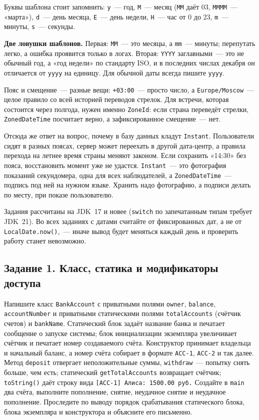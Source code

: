 Буквы шаблона стоит запомнить: \texttt{y}~--- год, \texttt{M}~--- месяц
(\texttt{MM} даёт 03, \texttt{MMMM}~--- «марта»), \texttt{d}~--- день месяца,
\texttt{E}~--- день недели, \texttt{H}~--- час от 0 до 23, \texttt{m}~---
минуты, \texttt{s}~--- секунды.

\begin{oshibka}
\textbf{Две ловушки шаблонов.} Первая: \texttt{MM}~--- это месяцы, а
\texttt{mm}~--- минуты; перепутать легко, а ошибка проявится только в логах.
Вторая: \texttt{YYYY} заглавными~--- это не обычный год, а «год недели» по
стандарту ISO, и в последних числах декабря он отличается от \texttt{yyyy} на
единицу. Для обычной даты всегда пишите \texttt{yyyy}.
\end{oshibka}

Пояс и смещение~--- разные вещи: \texttt{+03:00}~--- просто число, а
\texttt{Europe/Moscow}~--- целое правило со всей историей переводов стрелок.
Для встречи, которая состоится через полгода, нужен именно \texttt{ZoneId}:
если страна переведёт стрелки, \texttt{ZonedDateTime} посчитает верно, а
зафиксированное смещение~--- нет.

Отсюда же ответ на вопрос, почему в базу данных кладут \texttt{Instant}.
Пользователи сидят в разных поясах, сервер может переехать в другой
дата-центр, а правила перехода на летнее время страны меняют законом. Если
сохранить «14:30» без пояса, восстановить момент уже не удастся.
\texttt{Instant}~--- это фотография показаний секундомера, одна для всех
наблюдателей, а \texttt{ZonedDateTime}~--- подпись под ней на нужном языке.
Хранить надо фотографию, а подписи делать по месту, при показе пользователю.

\praktikum{}

Задания рассчитаны на JDK~17 и новее (\texttt{switch} по запечатанным типам
требует JDK~21). Во всех заданиях с датами считайте от фиксированных дат, а не
от \texttt{LocalDate.now()},~--- иначе вывод будет меняться каждый день и
проверить работу станет невозможно.

\subsection*{Задание 1. Класс, статика и модификаторы доступа}

Напишите класс \texttt{BankAccount} с приватными полями \texttt{owner},
\texttt{balance}, \texttt{accountNumber} и приватными статическими полями
\texttt{totalAccounts} (счётчик счетов) и \texttt{bankName}. Статический блок
задаёт название банка и печатает сообщение о запуске системы; блок
инициализации экземпляра увеличивает счётчик и печатает номер создаваемого
счёта. Конструктор принимает владельца и начальный баланс, а номер счёта
собирает в формате \texttt{ACC-1}, \texttt{ACC-2} и так далее. Метод
\texttt{deposit} отвергает неположительные суммы, \texttt{withdraw}~---
попытку снять больше, чем есть; статический \texttt{getTotalAccounts}
возвращает счётчик; \texttt{toString()} даёт строку вида
\texttt{[ACC-1] Алиса: 1500.00 руб.} Создайте в \texttt{main} два счёта,
выполните пополнение, снятие, неудачное снятие и неудачное пополнение.
Проследите по выводу порядок срабатывания статического блока, блока
экземпляра и конструктора и объясните его письменно.

